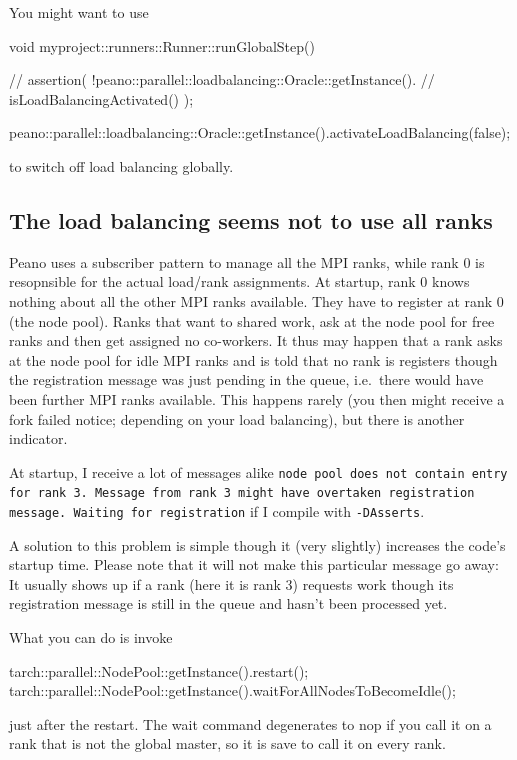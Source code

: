 You might want to use
\begin{code}
void myproject::runners::Runner::runGlobalStep() {
  // assertion( !peano::parallel::loadbalancing::Oracle::getInstance().
  // isLoadBalancingActivated() );

  peano::parallel::loadbalancing::Oracle::getInstance().activateLoadBalancing(false);
}
\end{code}

\noindent
to switch off load balancing globally.



\subsection{The load balancing seems not to use all ranks}

\noindent
Peano uses a subscriber pattern to manage all the MPI ranks, while rank 0 is
resopnsible for the actual load/rank assignments.
At startup, rank 0 knows nothing about all the other MPI ranks available.
They have to register at rank 0 (the node pool).
Ranks that want to shared work, ask at the node pool for free ranks and then get
assigned no co-workers.
It thus may happen that a rank asks at the node pool for idle MPI ranks and is
told that no rank is registers though the registration message was just pending
in the queue, i.e.~there would have been further MPI ranks available.
This happens rarely (you then might receive a fork failed notice; depending on
your load balancing), but there is another indicator.

\begin{smell}
  At startup, I receive a lot of messages alike \texttt{node pool does not
  contain entry for rank 3. Message from rank 3 might have overtaken
  registration message. Waiting for registration} if I compile with
  \texttt{-DAsserts}.
\end{smell}

\noindent
A solution to this problem is simple though it (very slightly) increases the
code's startup time.
Please note that it will not make this particular message go away:  
It usually shows up if a rank (here it is rank 3) requests work though its
registration message is still in the queue and hasn't been processed yet.

What you can do is invoke 
\begin{code}
  tarch::parallel::NodePool::getInstance().restart();
  tarch::parallel::NodePool::getInstance().waitForAllNodesToBecomeIdle();
\end{code}
\noindent
just after the restart.
The wait command degenerates to nop if you call it on a rank that is not the
global master, so it is save to call it on every rank.
